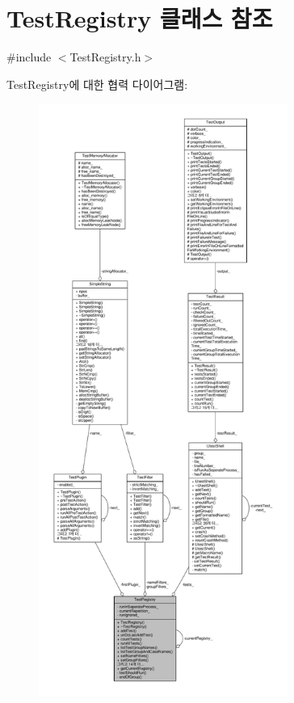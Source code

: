\hypertarget{class_test_registry}{}\section{Test\+Registry 클래스 참조}
\label{class_test_registry}


{\ttfamily \#include $<$Test\+Registry.\+h$>$}



Test\+Registry에 대한 협력 다이어그램\+:
\nopagebreak
\begin{figure}[H]
\begin{center}
\leavevmode
\includegraphics[height=550pt]{class_test_registry__coll__graph}
\end{center}
\end{figure}
